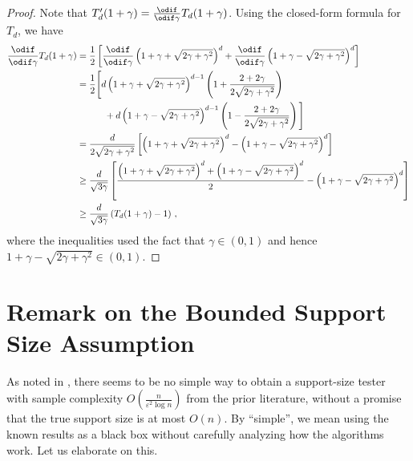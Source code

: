 \documentclass{theoretics}
\renewcommand{\epsilon}{\varepsilon}
\begin{document}
\restdprimelb*
\begin{proof}
    Note that $T_d'(1+\gamma) = \frac{\odif}{\odif \gamma} T_d(1+\gamma)$. Using the closed-form
    formula for $T_d$, we have
    \begin{align*}
        \frac{\odif}{\odif \gamma} T_d(1+\gamma)
        &= \frac{1}{2} \left[
            \frac{\odif}{\odif \gamma} \left(1+\gamma + \sqrt{2\gamma+\gamma^2}\right)^d
            + \frac{\odif}{\odif \gamma} \left(1+\gamma - \sqrt{2\gamma+\gamma^2}\right)^d
        \right] \\
        &= \frac{1}{2} \Bigg[
            d \left(1+\gamma + \sqrt{2\gamma+\gamma^2}\right)^{d-1} \left(
                1 + \frac{2+2\gamma}{2\sqrt{2\gamma+\gamma^2}}
            \right) \\
        &\qquad \quad
            + d \left(1+\gamma - \sqrt{2\gamma+\gamma^2}\right)^{d-1} \left(
                1 - \frac{2+2\gamma}{2\sqrt{2\gamma+\gamma^2}}
            \right)
        \Bigg] \\
        &= \frac{d}{2\sqrt{2\gamma+\gamma^2}} \left[
            \left(1+\gamma + \sqrt{2\gamma+\gamma^2}\right)^d
            - \left(1+\gamma - \sqrt{2\gamma+\gamma^2}\right)^d
        \right] \\
        &\ge \frac{d}{\sqrt{3\gamma}} \left[
            \frac{\left(1+\gamma + \sqrt{2\gamma+\gamma^2}\right)^d
                + \left(1+\gamma - \sqrt{2\gamma+\gamma^2}\right)^d}{2}
            - \left(1+\gamma - \sqrt{2\gamma+\gamma^2}\right)^d
        \right] \\
        &\ge \frac{d}{\sqrt{3\gamma}} \left( T_d(1+\gamma) - 1 \right) \,,
    \end{align*}
    where the inequalities used the fact that $\gamma \in (0,1)$ and hence $1 + \gamma -
    \sqrt{2\gamma+\gamma^2} \in (0, 1)$.
\end{proof}

\section{Remark on the Bounded Support Size Assumption}
\label{section:support-assumption}
\label{section:instance-optimal}

As noted in \cite[pp.~21]{GR23}, there seems to be no simple way to obtain a support-size tester
with sample complexity $O\left(\frac{n}{\epsilon^2 \log n}\right)$ from the prior literature,
without a promise that the true support size is at most $O(n)$. By ``simple''\!, we mean using the
known results as a black box without carefully analyzing how the algorithms work. Let us elaborate
on this.
\end{document}
